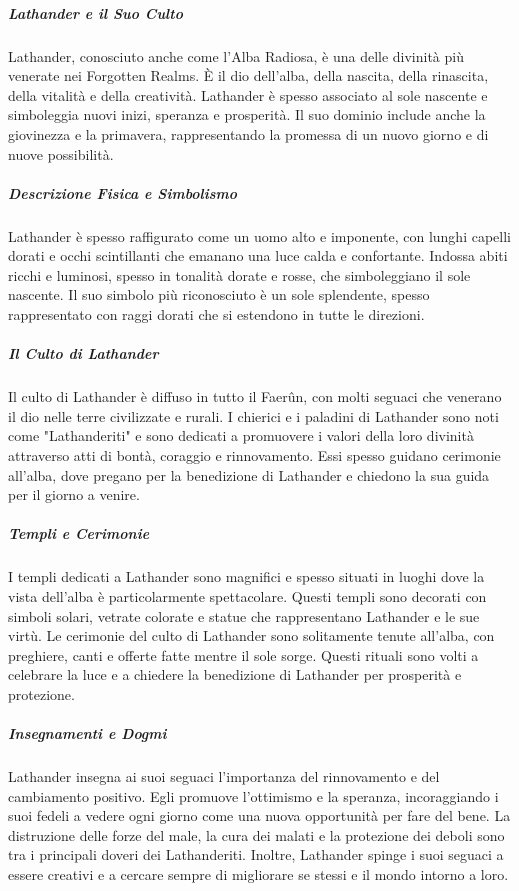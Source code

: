 \documentclass{article}
\begin{document}
\subparagraph{Lathander e il Suo Culto}
Lathander, conosciuto anche come l'Alba Radiosa, è una delle divinità più venerate nei Forgotten Realms. È il dio dell'alba, della nascita, della rinascita, della vitalità e della creatività. Lathander è spesso associato al sole nascente e simboleggia nuovi inizi, speranza e prosperità. Il suo dominio include anche la giovinezza e la primavera, rappresentando la promessa di un nuovo giorno e di nuove possibilità.

\subparagraph{Descrizione Fisica e Simbolismo}
Lathander è spesso raffigurato come un uomo alto e imponente, con lunghi capelli dorati e occhi scintillanti che emanano una luce calda e confortante. Indossa abiti ricchi e luminosi, spesso in tonalità dorate e rosse, che simboleggiano il sole nascente. Il suo simbolo più riconosciuto è un sole splendente, spesso rappresentato con raggi dorati che si estendono in tutte le direzioni.

\subparagraph{Il Culto di Lathander}
Il culto di Lathander è diffuso in tutto il Faerûn, con molti seguaci che venerano il dio nelle terre civilizzate e rurali. I chierici e i paladini di Lathander sono noti come "Lathanderiti" e sono dedicati a promuovere i valori della loro divinità attraverso atti di bontà, coraggio e rinnovamento. Essi spesso guidano cerimonie all'alba, dove pregano per la benedizione di Lathander e chiedono la sua guida per il giorno a venire.

\subparagraph{Templi e Cerimonie}
I templi dedicati a Lathander sono magnifici e spesso situati in luoghi dove la vista dell'alba è particolarmente spettacolare. Questi templi sono decorati con simboli solari, vetrate colorate e statue che rappresentano Lathander e le sue virtù. Le cerimonie del culto di Lathander sono solitamente tenute all'alba, con preghiere, canti e offerte fatte mentre il sole sorge. Questi rituali sono volti a celebrare la luce e a chiedere la benedizione di Lathander per prosperità e protezione.

\subparagraph{Insegnamenti e Dogmi}
Lathander insegna ai suoi seguaci l'importanza del rinnovamento e del cambiamento positivo. Egli promuove l'ottimismo e la speranza, incoraggiando i suoi fedeli a vedere ogni giorno come una nuova opportunità per fare del bene. La distruzione delle forze del male, la cura dei malati e la protezione dei deboli sono tra i principali doveri dei Lathanderiti. Inoltre, Lathander spinge i suoi seguaci a essere creativi e a cercare sempre di migliorare se stessi e il mondo intorno a loro.
\end{document}
